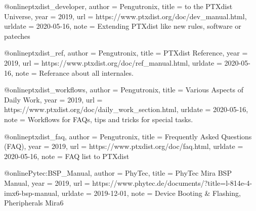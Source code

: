 @online{ptxdist_developer,
    author = {Pengutronix},
    title = {to the PTXdist Universe},
    year = 2019,
    url = {https://www.ptxdist.org/doc/dev_manual.html},
    urldate = {2020-05-16},
    note = {Extending PTXdist like new rules, software or pateches }
}

@online{ptxdist_ref,
    author = {Pengutronix},
    title = {PTXdist Reference},
    year = 2019,
    url = {https://www.ptxdist.org/doc/ref_manual.html},
    urldate = {2020-05-16},
    note = {Referance about all internales.}
}

@online{ptxdist_workflows,
    author = {Pengutronix},
    title = {Various Aspects of Daily Work},
    year = 2019,
    url = {https://www.ptxdist.org/doc/daily_work_section.html},
    urldate = {2020-05-16},
    note = {Workflows for FAQs, tips and tricks for special tasks.}
}

@online{ptxdist_faq,
    author = {Pengutronix},
    title = {Frequently Asked Questions (FAQ)},
    year = 2019,
    url = {https://www.ptxdist.org/doc/faq.html},
    urldate = {2020-05-16},
    note = {FAQ list to PTXdist}
}

@online{Pytec:BSP_Manual,
author = {PhyTec},
title = {{PhyTec Mira} BSP Manual},
year = 2019,
url = {https://www.phytec.de/documents/?title=l-814e-4-imx6-bsp-manual},
urldate = {2019-12-01},
note = {Device Booting \& Flashing, Pheripherals Mira6}
}

